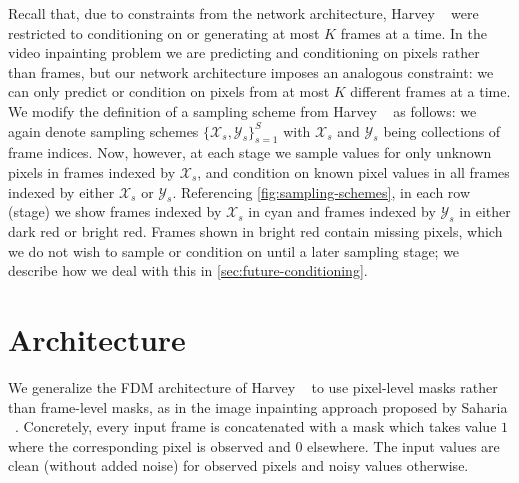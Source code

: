 Recall that, due to constraints from the network architecture, Harvey \etal~\cite{fdm} were restricted to conditioning on or generating at most $K$ frames at a time. In the video inpainting problem we are predicting and conditioning on pixels rather than frames, but our network architecture imposes an analogous constraint: we can only predict or condition on pixels from at most $K$ different frames at a time. We modify the definition of a sampling scheme from Harvey \etal~\cite{fdm} as follows: we again denote sampling schemes $\{\mathcal{X}_s, \mathcal{Y}_s\}_{s=1}^S$ with $\mathcal{X}_s$ and $\mathcal{Y}_s$ being collections of frame indices. Now, however, at each stage we sample values for only unknown pixels in frames indexed by $\mathcal{X}_s$, and condition on known pixel values in all frames indexed by either $\mathcal{X}_s$ or $\mathcal{Y}_s$. Referencing \cref{fig:sampling-schemes}, in each row (stage) we show frames indexed by $\mathcal{X}_s$ in \textcolor{latentcolor}{cyan} and frames indexed by $\mathcal{Y}_s$ in either \textcolor{observedpastcolor}{dark red} or \textcolor{observedfuturecolor}{bright red}. Frames shown in \textcolor{observedfuturecolor}{bright red} contain missing pixels, which we do not wish to sample or condition on until a later sampling stage; we describe how we deal with this in \cref{sec:future-conditioning}.


\section{Architecture}
We generalize the FDM architecture of Harvey \etal~\cite{fdm} to use pixel-level masks rather than frame-level masks, as in the image inpainting approach proposed by Saharia \etal~\cite{palette}. Concretely, every input frame is concatenated with a mask which takes value $1$ where the corresponding pixel is observed and $0$ elsewhere. The input values are clean (without added noise) for observed pixels and noisy values otherwise.



